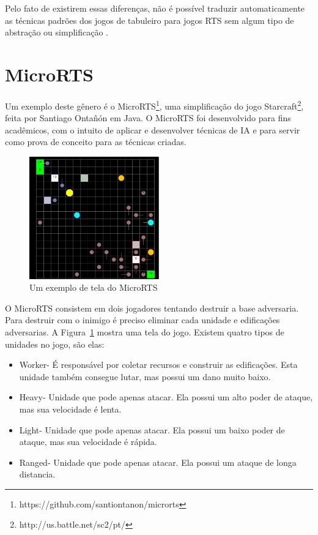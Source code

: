  
 Pelo fato de existirem essas diferenças, não é possível traduzir automaticamente as técnicas padrões dos jogos de tabuleiro para jogos RTS sem algum tipo de abstração ou simplificação \cite{ontanon2013survey}.
 
\section{MicroRTS}  
 
 Um exemplo deste gênero é o MicroRTS\footnote{https://github.com/santiontanon/microrts}, uma simplificação do jogo Starcraft\footnote{http://us.battle.net/sc2/pt/}, feita por Santiago Ontañón \cite{ontanon2013combinatorial} em Java. O MicroRTS foi desenvolvido para fins acadêmicos, com o intuito de aplicar e desenvolver técnicas de IA e para servir como prova de conceito para as técnicas criadas.
 
 \begin{figure}[ht]
 	\centering
 	\includegraphics[width=0.5\textwidth]{fig/microrts.pdf}
 	\caption{Um exemplo de tela do MicroRTS}
 	\label{fig:microrts}
 \end{figure} 
 
O MicroRTS consistem em dois jogadores tentando destruir a base adversaria. Para destruir com o inimigo é preciso eliminar cada unidade e edificações adversarias. A Figura~\ref{fig:microrts} mostra uma tela do jogo. Existem quatro tipos de unidades no jogo, são elas:
  
\begin{itemize}
 	\item Worker- É responsável por coletar recursos e construir as edificações. Esta unidade também consegue lutar, mas possui um dano muito baixo.
 	\item Heavy- Unidade que pode apenas atacar. Ela possui um alto poder de ataque, mas sua velocidade é lenta.
 	\item Light- Unidade que pode apenas atacar. Ela possui um baixo poder de ataque, mas sua velocidade é rápida.
 	\item Ranged- Unidade que pode apenas atacar. Ela possui um ataque de longa distancia. 
\end{itemize} 
 
